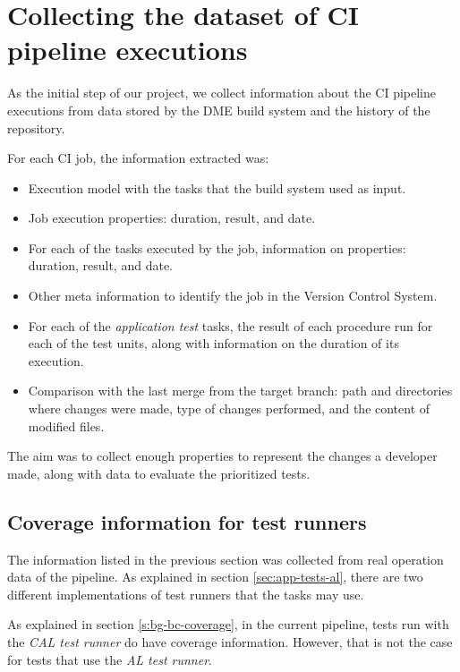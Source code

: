 \section{Collecting the dataset of CI pipeline executions}\label{s:method-collecting-dataset}

As the initial step of our project, we collect information about the CI pipeline executions
from data stored by the DME build system and the history of the repository.

For each CI job, the information extracted was:
\begin{itemize}
    \item Execution model with the tasks that the build system used as input.
    \item Job execution properties: duration, result, and date.
    \item For each of the tasks executed by the job, information on properties: duration, result, and date.
    \item Other meta information to identify the job in the Version Control System.
    \item For each of the \emph{application test} tasks, the result of each procedure run for each of the test units, along with information on the duration of its execution.
    \item Comparison with the last merge from the target branch: path and directories where changes were made, type of changes performed, and the content of modified files.
\end{itemize}

The aim was to collect enough properties to represent the changes a developer made, 
along with data to evaluate the prioritized tests.

\subsection{Coverage information for test runners}\label{s:method-collecting-coverage}

The information listed in the previous section was collected from real operation data
of the pipeline. As explained in section \ref{sec:app-tests-al}, there are two different
implementations of test runners that the tasks may use.

As explained in section \ref{s:bg-bc-coverage}, in the current pipeline, tests run with the \emph{CAL test runner}
do have coverage information. However, that is not the case for tests that use the \emph{AL test runner}.


